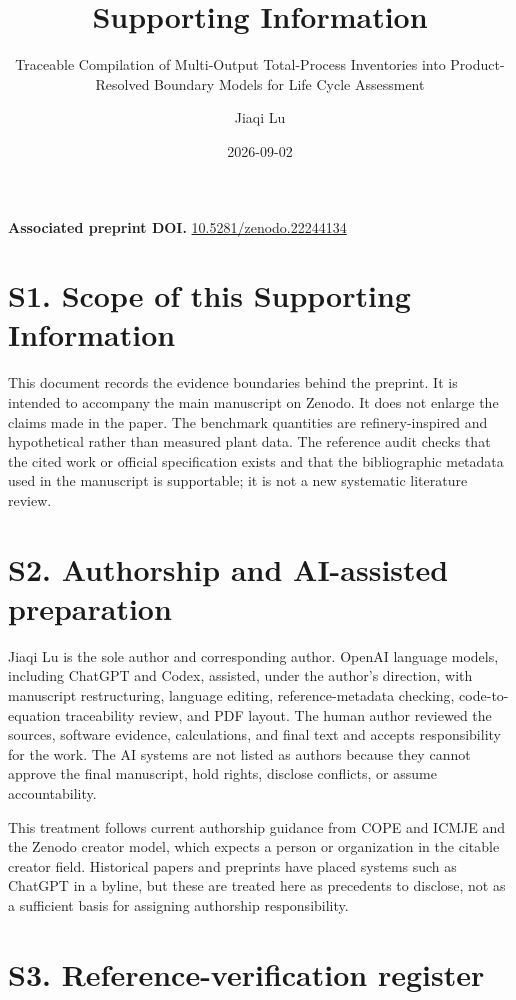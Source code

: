 \documentclass[
  10pt,
  a4paper,
  DIV=11,
  numbers=noendperiod]{scrartcl}
\title{Supporting Information}
\subtitle{Traceable Compilation of Multi-Output Total-Process
Inventories into Product-Resolved Boundary Models for Life Cycle
Assessment}
\author{Jiaqi Lu}
\date{2026-09-02}
\begin{document}
\maketitle


\textbf{Associated preprint DOI.}
\href{https://doi.org/10.5281/zenodo.22244134}{10.5281/zenodo.22244134}

\section{S1. Scope of this Supporting
Information}\label{s1.-scope-of-this-supporting-information}

This document records the evidence boundaries behind the preprint. It is
intended to accompany the main manuscript on Zenodo. It does not enlarge
the claims made in the paper. The benchmark quantities are
refinery-inspired and hypothetical rather than measured plant data. The
reference audit checks that the cited work or official specification
exists and that the bibliographic metadata used in the manuscript is
supportable; it is not a new systematic literature review.

\section{S2. Authorship and AI-assisted
preparation}\label{s2.-authorship-and-ai-assisted-preparation}

Jiaqi Lu is the sole author and corresponding author. OpenAI language
models, including ChatGPT and Codex, assisted, under the author's
direction, with manuscript restructuring, language editing,
reference-metadata checking, code-to-equation traceability review, and
PDF layout. The human author reviewed the sources, software evidence,
calculations, and final text and accepts responsibility for the work.
The AI systems are not listed as authors because they cannot approve the
final manuscript, hold rights, disclose conflicts, or assume
accountability.

This treatment follows current authorship guidance from COPE and ICMJE
and the Zenodo creator model, which expects a person or organization in
the citable creator field. Historical papers and preprints have placed
systems such as ChatGPT in a byline, but these are treated here as
precedents to disclose, not as a sufficient basis for assigning
authorship responsibility.

\section{S3. Reference-verification
register}\label{s3.-reference-verification-register}
\end{document}
